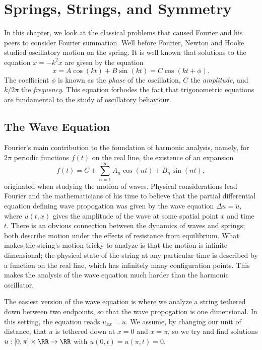 \chapter{Springs, Strings, and Symmetry}

In this chapter, we look at the classical problems that caused Fourier and his peers to consider Fourier summation. Well before Fourier, Newton and Hooke studied oscillatory motion on the spring. It is well known that solutions to the equation $\ddot{x} = -k^2 x$ are given by the equation
%
\[ x = A \cos(kt) + B \sin(kt) = C \cos(kt + \phi). \]
%
The coefficient $\phi$ is known as the \emph{phase} of the oscillation, $C$ the \emph{amplitude}, and $k/2\pi$ the \emph{frequency}. This equation forbodes the fact that trigonometric equations are fundamental to the study of oscillatory behaviour.

\section{The Wave Equation}

Fourier's main contribution to the foundation of harmonic analysis, namely, for $2 \pi$ periodic functions $f(t)$ on the real line, the existence of an expansion
%
\[ f(t) = C + \sum_{n = 1}^\infty A_n \cos(nt) + B_n \sin(nt), \]
%
originated when studying the motion of waves. Physical considerations lead Fourier and the mathematicians of his time to believe that the partial differential equation defining wave propogation was given by the wave equation $\Delta u = \ddot{u}$, where $u(t,x)$ gives the amplitude of the wave at some spatial point $x$ and time $t$. There is an obvious connection between the dynamics of waves and springs; both describe motion under the effects of resistance from equilibrium. What makes the string's motion tricky to analyze is that the motion is infinite dimensional; the physical state of the string at any particular time is described by a function on the real line, which has infinitely many configuration points. This makes the analysis of the wave equation much harder than the harmonic oscillator.

The easiest version of the wave equation is where we analyze a string tethered down between two endpoints, so that the wave propogation is one dimensional. In this setting, the equation reads $u_{xx} = \ddot{u}$. We assume, by changing our unit of distance, that $u$ is tethered down at $x = 0$ and $x = \pi$, so we try and find solutions $u: [0,\pi] \times \RR \to \RR$ with $u(0,t) = u(\pi,t) = 0$.


